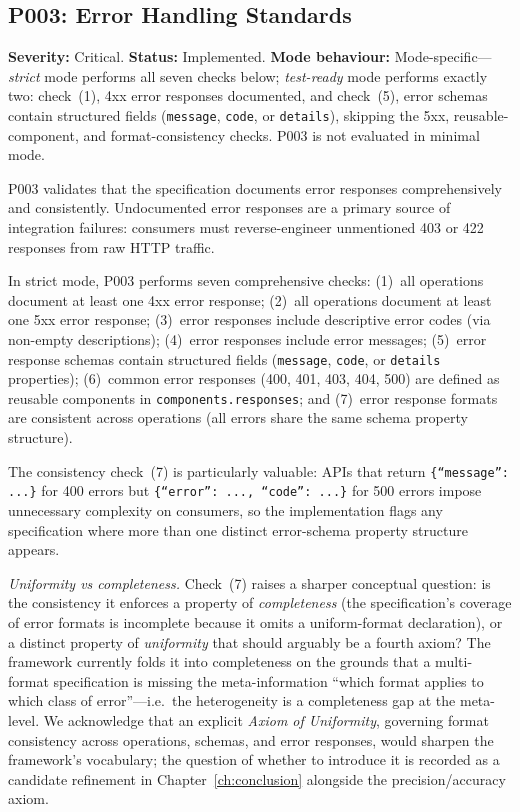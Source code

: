 \subsection{P003: Error Handling Standards}
\label{subsec:p003}

\textbf{Severity:} Critical. \textbf{Status:} Implemented. \textbf{Mode behaviour:} Mode-specific---\textit{strict} mode performs all seven checks below; \textit{test-ready} mode performs exactly two: check~(1), 4xx error responses documented, and check~(5), error schemas contain structured fields (\texttt{message}, \texttt{code}, or \texttt{details}), skipping the 5xx, reusable-component, and format-consistency checks. P003 is not evaluated in minimal mode.

P003 validates that the specification documents error responses comprehensively and consistently. Undocumented error responses are a primary source of integration failures: consumers must reverse-engineer unmentioned 403 or 422 responses from raw HTTP traffic.

In strict mode, P003 performs seven comprehensive checks: (1)~all operations document at least one 4xx error response; (2)~all operations document at least one 5xx error response; (3)~error responses include descriptive error codes (via non-empty descriptions); (4)~error responses include error messages; (5)~error response schemas contain structured fields (\texttt{message}, \texttt{code}, or \texttt{details} properties); (6)~common error responses (400, 401, 403, 404, 500) are defined as reusable components in \texttt{components.responses}; and (7)~error response formats are consistent across operations (all errors share the same schema property structure).

The consistency check~(7) is particularly valuable: APIs that return \texttt{\{``message'': ...\}} for 400 errors but \texttt{\{``error'': ..., ``code'': ...\}} for 500 errors impose unnecessary complexity on consumers, so the implementation flags any specification where more than one distinct error-schema property structure appears.

\textit{Uniformity vs completeness.} Check~(7) raises a sharper conceptual question: is the consistency it enforces a property of \emph{completeness} (the specification's coverage of error formats is incomplete because it omits a uniform-format declaration), or a distinct property of \emph{uniformity} that should arguably be a fourth axiom? The framework currently folds it into completeness on the grounds that a multi-format specification is missing the meta-information ``which format applies to which class of error''---i.e.\ the heterogeneity is a completeness gap at the meta-level. We acknowledge that an explicit \emph{Axiom of Uniformity}, governing format consistency across operations, schemas, and error responses, would sharpen the framework's vocabulary; the question of whether to introduce it is recorded as a candidate refinement in Chapter~\ref{ch:conclusion} alongside the precision/accuracy axiom.

